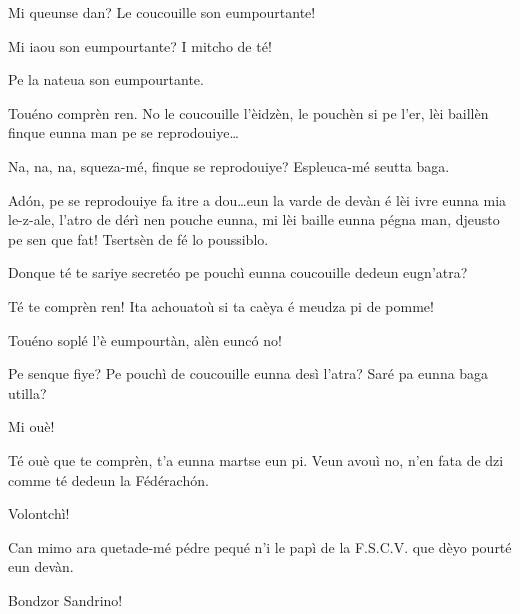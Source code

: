 \begin{drama}
\Richardspeaks Mi queunse dan? Le coucouille son eumpourtante! 

\Tuenospeaks Mi iaou son eumpourtante? I mitcho de té!

\Gerominespeaks Pe la nateua son eumpourtante.

\Richardspeaks{} Touéno comprèn ren. No le coucouille l'èi\-dzèn, le pouchèn si pe l'er, lèi baillèn finque eunna man pe se reprodouiye\ldots

\Tuenospeaks{} Na, na, na, squeza-mé, finque se reprodouiye? Es\-pleu\-ca-mé seutta baga.

\Richardspeaks Ad\'on, pe se reprodouiye fa itre a dou\ldots eun la varde de devàn é lèi ivre eunna mia le-z-ale, l'atro de dérì nen pouche eunna, mi lèi baille eunna pégna man, djeusto pe sen que fat! Tsertsèn de fé lo poussiblo.

\Tuenospeaks Donque té te sariye secretéo pe pouchì eunna coucouille dedeun eugn'atra?

\Richardspeaks Té te comprèn ren! Ita achouatoù si ta caèya é meudza pi de pomme!

\Gerominespeaks Touéno soplé l'è eumpourtàn, alèn eunc\'o no!

\Tuenospeaks Pe senque fiye? Pe pouchì de coucouille eunna desì l'atra? Saré pa eunna baga utilla?

\Gerominespeaks Mi ouè!

\Richardspeaks{} Té ouè que te comprèn, t'a eunna martse eun pi. Veun avouì no, n'en fata de dzi comme té dedeun la Fédérach\'on.

\Gerominespeaks Volontchì!


\Richardspeaks Can mimo ara quetade-mé pédre pequé n'i le papì de la F.S.C.V. que dèyo pourté eun devàn.





\Saventaspeaks Bondzor Sandrino!


\end{drama}
